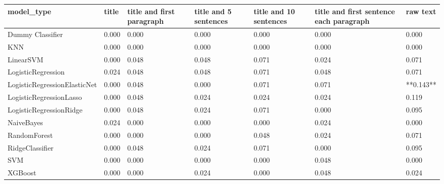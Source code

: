 \begin{tabular}{lllllll}
\toprule
                  model\_type & title & title and first paragraph & title and 5 sentences & title and 10 sentences & title and first sentence each paragraph &  raw text \\
\midrule
            Dummy Classifier & 0.000 &                     0.000 &                 0.000 &                  0.000 &                                   0.000 &     0.000 \\
                         KNN & 0.000 &                     0.000 &                 0.000 &                  0.000 &                                   0.000 &     0.000 \\
                   LinearSVM & 0.000 &                     0.048 &                 0.048 &                  0.071 &                                   0.024 &     0.071 \\
          LogisticRegression & 0.024 &                     0.048 &                 0.048 &                  0.071 &                                   0.048 &     0.071 \\
LogisticRegressionElasticNet & 0.000 &                     0.048 &                 0.000 &                  0.071 &                                   0.071 & **0.143** \\
     LogisticRegressionLasso & 0.000 &                     0.048 &                 0.024 &                  0.024 &                                   0.024 &     0.119 \\
     LogisticRegressionRidge & 0.000 &                     0.048 &                 0.024 &                  0.071 &                                   0.000 &     0.095 \\
                  NaiveBayes & 0.024 &                     0.000 &                 0.000 &                  0.000 &                                   0.024 &     0.000 \\
                RandomForest & 0.000 &                     0.000 &                 0.000 &                  0.048 &                                   0.024 &     0.071 \\
             RidgeClassifier & 0.000 &                     0.048 &                 0.024 &                  0.071 &                                   0.000 &     0.095 \\
                         SVM & 0.000 &                     0.000 &                 0.000 &                  0.000 &                                   0.048 &     0.000 \\
                     XGBoost & 0.000 &                     0.000 &                 0.024 &                  0.000 &                                   0.048 &     0.024 \\
\bottomrule
\end{tabular}
